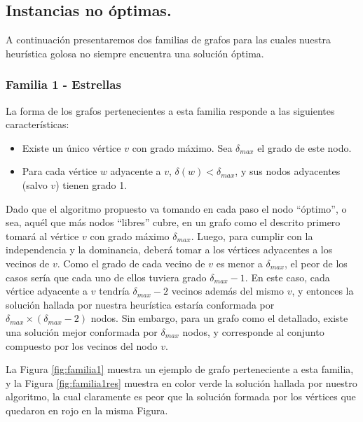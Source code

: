 \vspace*{0.6cm}

\subsection{Instancias no óptimas.}

\vspace*{0.3cm}

A continuación presentaremos dos familias de grafos para las cuales nuestra heurística golosa no siempre encuentra una solución óptima.

\subsubsection*{Familia 1 - Estrellas}

La forma de los grafos pertenecientes a esta familia responde a las siguientes características:

\begin{itemize}
\item Existe un único vértice $v$ con grado máximo.  Sea $\delta_{max}$ el grado de este nodo.
\item Para cada vértice $w$ adyacente a $v$, $\delta(w) < \delta_{max}$, y sus nodos adyacentes (salvo $v$) tienen grado 1.	
\end{itemize}

Dado que el algoritmo propuesto va tomando en cada paso el nodo ``óptimo'', o sea, aquél que más nodos ``libres'' cubre, en un grafo como el descrito primero tomará al vértice $v$ con grado máximo $\delta_{max}$.  Luego, para cumplir con la independencia y la dominancia, deberá tomar a los vértices adyacentes a los vecinos de $v$. Como el grado de cada vecino de $v$ es menor a $\delta_{max}$, el peor de los casos sería que cada uno de ellos tuviera grado $\delta_{max} - 1$.  En este caso, cada vértice adyacente a $v$ tendría $\delta_{max} - 2$ vecinos además del mismo $v$, y entonces la solución hallada por nuestra heurística estaría conformada por $\delta_{max} \times (\delta_{max} - 2)$ nodos.  Sin embargo, para un grafo como el detallado, existe una solución mejor conformada por $\delta_{max}$ nodos, y corresponde al conjunto compuesto por los vecinos del nodo $v$.

La Figura \ref{fig:familia1} muestra un ejemplo de grafo perteneciente a esta familia, y la Figura \ref{fig:familia1res} muestra en color verde la solución hallada por nuestro algoritmo, la cual claramente es peor que la solución formada por los vértices que quedaron en rojo en la misma Figura.

